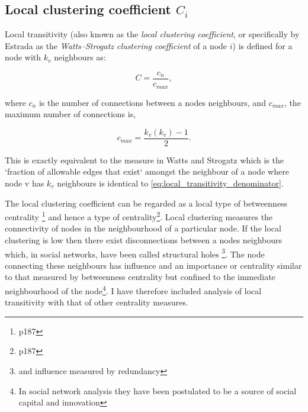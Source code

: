 \subsection{Local clustering coefficient $C_i$}
\label{sec:local clustering coefficient}
Local transitivity (also known as the \textit{local clustering coefficient}, or specifically by Estrada\cite{estrada2016local} as the \textit{Watts–Strogatz clustering coefficient} of a node $i$) is defined for a node with $k_v$ neighbours as: 

\begin{equation}
C = \frac{c_n}{c_{max}},
\end{equation}
\label{eq:local_transitvity}

where $c_n$ is the number of connections between a nodes neighbours, and $c_{max}$, the maximum number of connections is, 

\begin{equation}
c_{max} = \frac{k_v(k_v)-1}{2}.
\end{equation}
\label{eq:local_transitivity_denominator}

This \cite{newman2018networks} is exactly equivalent to the measure in Watts and Strogatz which is the `fraction of allowable edges that exist` amongst the neighbour of a node where node v has $k_v$ neighbours is identical to \ref{eq:local_transitivity_denominator}.

The local clustering coefficient can be regarded as a local type of betweenness centrality \cite{newman2018networks}\footnote{p187}  and hence a type of centrality\cite{newman2018networks}\footnote{p187}. Local clustering measures the connectivity of nodes in the neighbourhood of a particular node. If the local clustering is low then there exist disconnections between a nodes neighbours which, in social networks, have been called structural holes \cite{burt2009structural}\footnote{and influence measured by redundancy}. The node connecting these neighbours has influence and an importance or centrality similar to that measured by betweenness centrality but confined to the immediate neighbourhood of the node\footnote{In social network analysis they have been postulated to be a source of social capital and innovation}. I have therefore included analysis of local transitivity with that of other centrality measures. 


